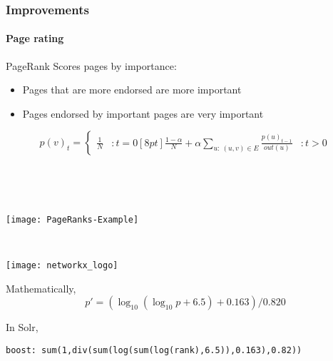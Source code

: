 \documentclass[table]{beamer}
\def\\{}
\begin{document}
\begin{frame}
\frametitle{Improvements}
\framesubtitle{Page rating}

\begin{minipage}[c]{0.58\textwidth}
    
\begin{block}{PageRank}
\footnotesize
Scores pages by importance:

\begin{itemize}
    \item Pages that are more endorsed are more important
    \item Pages endorsed by important pages are very important
\end{itemize}

\vspace{-1em}
\begin{equation*}
    p(v)_t = \begin{cases}
        \displaystyle\frac{1}{N} &: t=0 \\[8pt]
        \displaystyle\frac{1-\alpha}{N} + \alpha \sum_{u:~(u,v) \in E}{\frac{p(u)_{t-1}}{out(u)}} &: t>0
    \end{cases} \label{eq:iterative}
\end{equation*}

~

\end{block}

\end{minipage} ~~
\begin{minipage}[c]{0.38\textwidth}
    \centering
    \texttt{[image: PageRanks-Example]}
    
    ~
    
    \texttt{[image: networkx\_logo]}
\end{minipage}

\end{frame}

\begin{frame}[fragile]

\begin{minipage}[t]{0.33\linewidth}
    \centering
    
\end{minipage}%
\begin{minipage}[t]{0.33\linewidth}
    \centering
    
\end{minipage}%
\begin{minipage}[t]{0.33\linewidth}
    \centering
    
\end{minipage}

Mathematically,    
\begin{equation*}
    p' = (\log_{10}{(\log_{10}{p} + 6.5)} + 0.163)/0.820
\end{equation*}

In Solr,
\begin{verbatim}
boost: sum(1,div(sum(log(sum(log(rank),6.5)),0.163),0.82))
\end{verbatim}

\end{frame}
\end{document}

